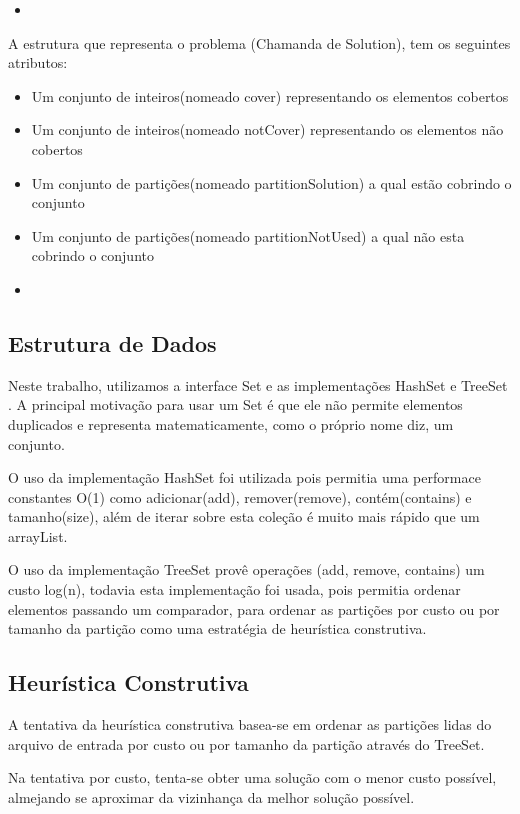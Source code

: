 \documentclass[a4paper, 10pt]{article} %
\newcommand{\insertcode}[2]{\begin{itemize}\item[]\end{itemize}}
\begin{document}
\insertcode{code/SubSet.java}{Classe Representando as Partições}

A estrutura que representa o problema (Chamanda de Solution), tem os seguintes atributos:
\begin{itemize}
	\item Um conjunto de inteiros(nomeado cover) representando os elementos cobertos
	\item Um conjunto de inteiros(nomeado notCover) representando os elementos não cobertos
	\item Um conjunto de partições(nomeado partitionSolution) a qual estão cobrindo o conjunto
	\item Um conjunto de partições(nomeado partitionNotUsed) a qual não esta cobrindo o conjunto 
\end{itemize}

\insertcode{code/Solution.java}{Classe Representando o Problema}

\subsection*{Estrutura de Dados}
Neste trabalho, utilizamos a interface 
Set \cite{website:java-set} e as implementações HashSet \cite{website:java-HashSet}  e TreeSet \cite{website:java-TreeSet}.
A principal motivação para usar um Set é que ele não permite elementos duplicados e representa
matematicamente, como o próprio nome diz, um conjunto.

O uso da implementação HashSet foi utilizada pois permitia uma performace constantes O(1) como
adicionar(add), remover(remove), contém(contains) e tamanho(size), além de iterar sobre esta coleção é muito mais rápido que um arrayList.

O uso da implementação TreeSet provê operações (add, remove, contains) um custo log(n), todavia esta implementação foi usada, pois permitia ordenar elementos passando um comparador, para ordenar as partições por custo ou por tamanho da partição como uma estratégia de heurística construtiva. 

\subsection*{Heurística Construtiva}
A tentativa da heurística construtiva basea-se em ordenar as partições lidas do arquivo de
entrada por custo ou por tamanho da partição através do TreeSet. 

Na tentativa por custo, tenta-se obter uma solução com o menor custo possível, almejando se aproximar da vizinhança da melhor solução possível.
\end{document}
